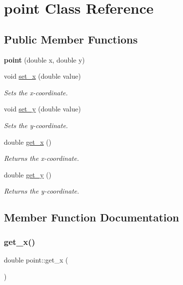 \hypertarget{classpoint}{}\section{point Class Reference}
\label{classpoint}
\subsection*{Public Member Functions}
\begin{DoxyCompactItemize}
\item 
\mbox{\label{classpoint_abe722dd304b3c2db9883f8dac82bdb15}} 
{\bfseries point} (double x, double y)
\item 
void \hyperlink{classpoint_a34325e94221145d6597fdfc2ffbc0ad0}{set\+\_\+x} (double value)
\begin{DoxyCompactList}\small\item\em Sets the x-\/coordinate. \end{DoxyCompactList}\item 
void \hyperlink{classpoint_ab17b468d5b16bd4feb4711ca5c7f0fe5}{set\+\_\+y} (double value)
\begin{DoxyCompactList}\small\item\em Sets the y-\/coordinate. \end{DoxyCompactList}\item 
double \hyperlink{classpoint_aab3e1efbb5d547237618f85566bc6dfe}{get\+\_\+x} ()
\begin{DoxyCompactList}\small\item\em Returns the x-\/coordinate. \end{DoxyCompactList}\item 
double \hyperlink{classpoint_aad40587598ac1121bdbf2f45128edcae}{get\+\_\+y} ()
\begin{DoxyCompactList}\small\item\em Returns the y-\/coordinate. \end{DoxyCompactList}\end{DoxyCompactItemize}


\subsection{Member Function Documentation}
\mbox{\label{classpoint_aab3e1efbb5d547237618f85566bc6dfe}} 
\subsubsection{\texorpdfstring{get\+\_\+x()}{get\_x()}}
{\footnotesize\ttfamily double point\+::get\+\_\+x (\begin{DoxyParamCaption}{ }\end{DoxyParamCaption})}



